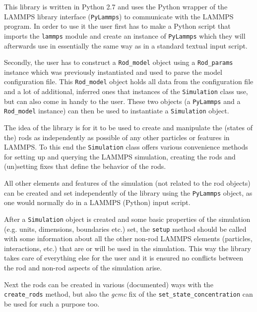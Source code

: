 \documentclass[a4paper]{article}
\begin{document}
This library is written in Python 2.7 and uses the Python wrapper of the LAMMPS library interface
(\texttt{PyLammps}) to communicate with the LAMMPS program. In order to use it the user first has to make
a Python script that imports the \texttt{lammps} module and create an instance of \texttt{PyLammps} which
they will afterwards use in essentially the same way as in a standard textual input script.

Secondly, the user has to construct a \texttt{Rod\_model} object using a \texttt{Rod\_params}
instance which was previously instantiated and used to parse the model configuration file.
This \texttt{Rod\_model} object holds all data from the configuration file and a lot of additional,
inferred ones that instances of the \texttt{Simulation} class use, but can also come in handy to the
user. These two objects (a \texttt{PyLammps} and a \texttt{Rod\_model} instance) can then be used to
instantiate a \texttt{Simulation} object.

\vspace{1em}

The idea of the library is for it to be used to create and manipulate the (states of the) rods as
independently as possible of any other particles or features in LAMMPS. To this end the
\texttt{Simulation} class offers various convenience methods for setting up and querying the LAMMPS
simulation, creating the rods and (un)setting fixes that define the behavior of the rods.

All other elements and features of the simulation (not related to the rod objects) can be created and
set independently of the library using the \texttt{PyLammps} object, as one would normally do in a
LAMMPS (Python) input script.

\vspace{1em}

After a \texttt{Simulation} object is created and some basic properties of the simulation (e.g. units,
dimensions, boundaries etc.) set, the \texttt{setup} method should be called with some information about
all the other non-rod LAMMPS elements (particles, interactions, etc.) that are or will be used in the
simulation. This way the library takes care of everything else for the user and it is ensured no
conflicts between the rod and non-rod aspects of the simulation arise.

Next the rods can be created in various (documented) ways with the \texttt{create\_rods} method, but also
the \emph{gcmc} fix of the \texttt{set\_state\_concentration} can be used for such a purpose too.
\end{document}
